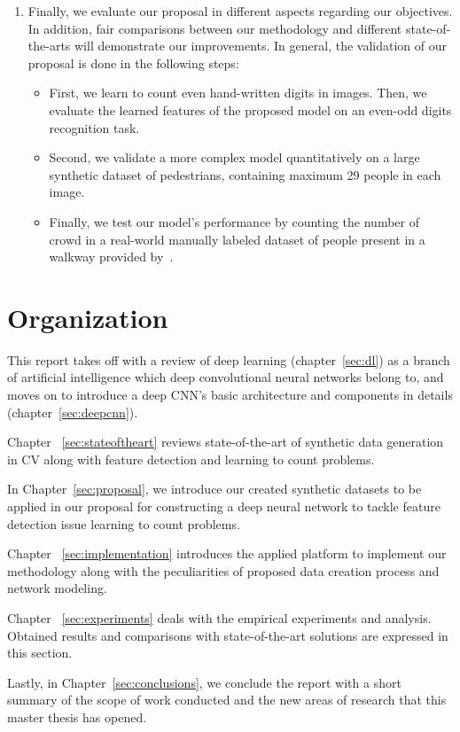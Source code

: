 \begin{enumerate}
	\item Finally, we evaluate our proposal in different aspects regarding our objectives. In addition, fair comparisons between our methodology and different state-of-the-arts will demonstrate our improvements. In general, the validation of our proposal is done in the following steps:

	\begin{itemize}
		\item First, we learn to count even hand-written digits in images. Then, we evaluate the learned features of the proposed model on an even-odd digits recognition task. 
		\item Second, we validate a more complex model  quantitatively on a large synthetic dataset of pedestrians, containing maximum 29 people in each image. 
		\item Finally, we test our model's performance by counting the number of crowd in a real-world manually labeled dataset of people present in a walkway provided by~\citealt*{chan2013ground}. 
	\end{itemize}
	
\end{enumerate}

\section{Organization}

This report takes off with a review of deep learning (chapter~\ref{sec:dl}) as a branch of artificial intelligence which deep convolutional neural networks belong to, and moves on to introduce a deep CNN's basic architecture and components in details (chapter~\ref{sec:deepcnn}). 


Chapter ~\ref{sec:stateoftheart} reviews state-of-the-art of synthetic data generation in CV along with feature detection and learning to count problems. 

In Chapter~\ref{sec:proposal}, we introduce our created synthetic datasets to be applied in our proposal for constructing a deep neural network to tackle feature detection issue learning to count problems. 

Chapter ~\ref{sec:implementation} introduces the applied platform to implement our methodology along with the peculiarities of proposed data creation process and network modeling. 

Chapter ~\ref{sec:experiments} deals with the empirical experiments and analysis. Obtained results and comparisons with state-of-the-art solutions are expressed in this section.

Lastly, in Chapter~\ref{sec:conclusions}, we conclude the report with a short summary of the scope of work conducted and the new areas of research that this master thesis has opened.
